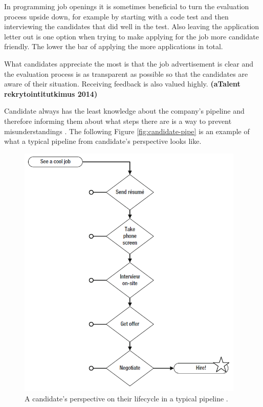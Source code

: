 \documentclass[11pt,a4paper,oneside,article]{memoir}
\begin{document}
In programming job openings it is sometimes beneficial to turn the evaluation process upside down, for example by starting with a code test and then interviewing the candidates that did well in the test. Also leaving the application letter out is one option when trying to make applying for the job more candidate friendly. The lower the bar of applying the more applications in total. \cite{noora:conversation}

What candidates appreciate the most is that the job advertisement is clear and the evaluation process is as transparent as possible so that the candidates are aware of their situation. Receiving feedback is also valued highly. \textbf{(aTalent rekrytointitutkimus 2014)} %

Candidate always has the least knowledge about the company's pipeline and therefore informing them about what steps there are is a way to prevent misunderstandings \cite[p.~26]{mcculler:book}. The following Figure \vref{fig:candidate-pipe} is an example of what a typical pipeline from candidate's perspective looks like.

\begin{figure}[h]
  \centering
  \includegraphics[width=10.8cm]{candidate_pipe}
  \caption{A candidate's perspective on their lifecycle in a typical pipeline \cite[p.~27]{mcculler:book}.}
  \label{fig:candidate-pipe}
\end{figure}
\end{document}

